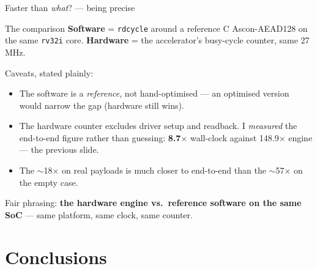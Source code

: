 \documentclass[aspectratio=169,11pt]{beamer}
\newcommand{\code}[1]{\texttt{\small #1}}
\begin{document}
\begin{frame}{Faster than \emph{what}? --- being precise}
\begin{block}{The comparison}
\small \textbf{Software} = \code{rdcycle} around a reference C Ascon-AEAD128 on the
same \code{rv32i} core. \quad
\textbf{Hardware} = the accelerator's busy-cycle counter, same 27\,MHz.
\end{block}
\vspace{1mm}
\alert{Caveats, stated plainly:}
\begin{itemize}\small
\item The software is a \emph{reference}, not hand-optimised --- an optimised
      version would narrow the gap (hardware still wins).
\item The hardware counter excludes driver setup and readback. I \emph{measured}
      the end-to-end figure rather than guessing: \textbf{8.7$\times$} wall-clock
      against 148.9$\times$ engine --- the previous slide.
\item The $\sim$18$\times$ on real payloads is much closer to end-to-end than the
      $\sim$57$\times$ on the empty case.
\end{itemize}
\vspace{1mm}
{\small Fair phrasing: \textbf{the hardware engine vs.\ reference software on the
same SoC} --- same platform, same clock, same counter.}
\end{frame}

\section{Conclusions}
\end{document}
